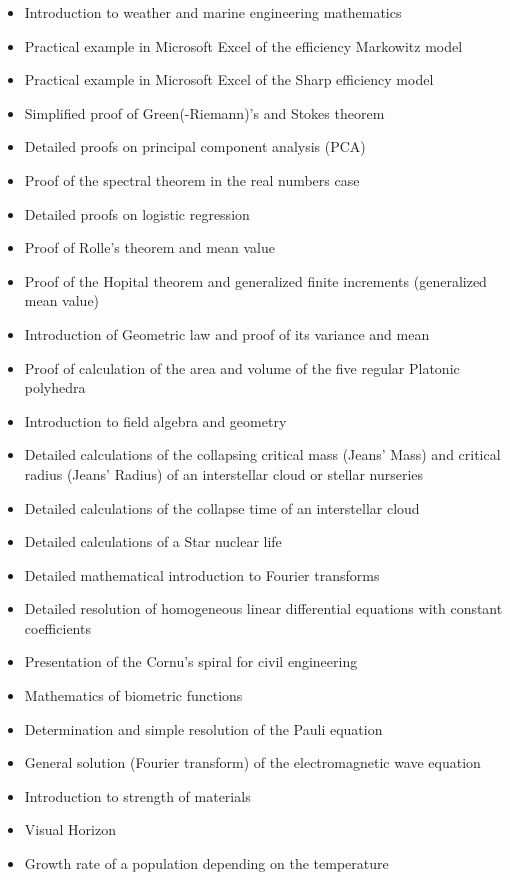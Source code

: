 \documentclass[12pt,a4paper,twoside,openright]{report}
\theoremstyle{definition}
\theoremstyle{itexmp}
\numberwithin{equation}{section}
\begin{document}
\begin{itemize}
\begin{itemize}[noitemsep]
				\item Introduction to weather and marine engineering mathematics
				\item Practical example in Microsoft Excel of the efficiency Markowitz model
				\item Practical example in Microsoft Excel of the Sharp efficiency model
				\item Simplified proof of Green(-Riemann)'s and Stokes theorem
				\item Detailed proofs on principal component analysis (PCA)
				\item Proof of the spectral theorem in the real numbers case
				\item Detailed proofs on logistic regression
				\item Proof of Rolle's theorem and mean value
				\item Proof of the Hopital theorem and generalized finite increments (generalized mean value)
				\item Introduction of Geometric law and proof of its variance and mean
				\item Proof of calculation of the area and volume of the five regular Platonic polyhedra
				\item Introduction to field algebra and geometry
				\item Detailed calculations of the collapsing critical mass (Jeans' Mass) and critical radius (Jeans' Radius) of an interstellar cloud or stellar nurseries
				\item Detailed calculations of the collapse time of an interstellar cloud
				\item Detailed calculations of a Star nuclear life
				\item Detailed mathematical introduction to Fourier transforms
				\item Detailed resolution of homogeneous linear differential equations with constant coefficients
				\item Presentation of the Cornu's spiral for civil engineering
				\item Mathematics of biometric functions
				\item Determination and simple resolution of the Pauli equation
				\item General solution (Fourier transform) of the electromagnetic wave equation
				\item Introduction to strength of materials
				\item Visual Horizon
				\item Growth rate of a population depending on the temperature

\end{itemize}
\end{itemize}
\end{document}
